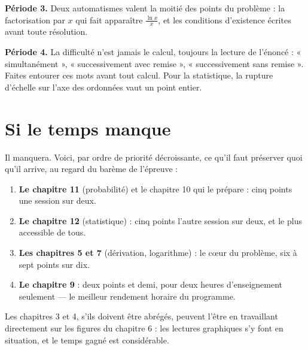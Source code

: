 \textbf{Période 3.} Deux automatismes valent la moitié des points du
problème : la factorisation par $x$ qui fait apparaître $\frac{\ln x}{x}$,
et les conditions d'existence écrites avant toute résolution.

\textbf{Période 4.} La difficulté n'est jamais le calcul, toujours la
lecture de l'énoncé : « simultanément », « successivement avec remise »,
« successivement sans remise ». Faites entourer ces mots avant tout calcul.
Pour la statistique, la rupture d'échelle sur l'axe des ordonnées vaut un
point entier.

\section{Si le temps manque}

Il manquera. Voici, par ordre de priorité décroissante, ce qu'il faut
préserver quoi qu'il arrive, au regard du barème de l'épreuve :

\begin{enumerate}[label=\textbf{\arabic*.}, leftmargin=*, itemsep=0.2em]
  \item \textbf{Le chapitre 11} (probabilité) et le chapitre 10 qui le
        prépare : cinq points une session sur deux.
  \item \textbf{Le chapitre 12} (statistique) : cinq points l'autre session
        sur deux, et le plus accessible de tous.
  \item \textbf{Les chapitres 5 et 7} (dérivation, logarithme) : le c\oe ur
        du problème, six à sept points sur dix.
  \item \textbf{Le chapitre 9} : deux points et demi, pour deux heures
        d'enseignement seulement — le meilleur rendement horaire du
        programme.
\end{enumerate}

Les chapitres 3 et 4, s'ils doivent être abrégés, peuvent l'être en
travaillant directement sur les figures du chapitre 6 : les lectures
graphiques s'y font en situation, et le temps gagné est considérable.
